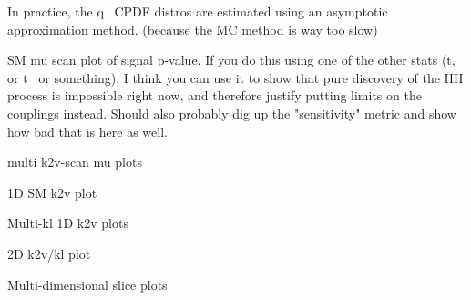 In practice, the q~ CPDF distros are estimated using an asymptotic approximation method\cite{asymptotic_formulae_for_likelihood}.
(because the MC method is way too slow)

SM mu scan plot of signal p-value.
If you do this using one of the other stats (t, or t~ or something),
    I think you can use it to show that pure discovery of the HH process is impossible right now,
    and therefore justify putting limits on the couplings instead.
Should also probably dig up the "sensitivity" metric and show how bad that is here as well.

multi k2v-scan mu plots

1D SM k2v plot

Multi-kl 1D k2v plots

2D k2v/kl plot

Multi-dimensional slice plots
